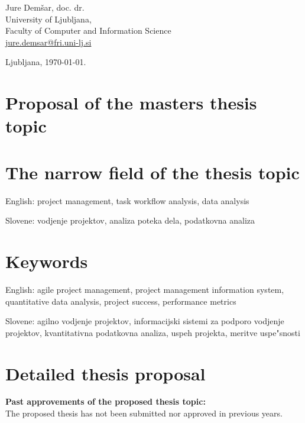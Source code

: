 \documentclass[a4paper, 12pt]{article}
\begin{document}
\hfill\begin{minipage}{\dimexpr\textwidth-2cm}
Jure Demšar, doc. dr. \\
University of Ljubljana, \\
Faculty of Computer and Information Science\\
\href{mailto:jure.demsar@fri.uni-lj.si}{jure.demsar@fri.uni-lj.si}
\end{minipage}

\bigskip

\hfill Ljubljana, \today.


\clearpage
\section*{Proposal of the masters thesis topic}

\section{The narrow field of the thesis topic}

English: project management, task workflow analysis, data analysis

Slovene: vodjenje projektov, analiza poteka dela, podatkovna analiza

\section{Keywords}

English: agile project management, project management information system, quantitative data analysis, project success, performance metrics

Slovene: agilno vodjenje projektov, informacijski sistemi za podporo vodjenje projektov, kvantitativna podatkovna analiza, uspeh projekta, meritve uspe"snosti

\section{Detailed thesis proposal}


\textbf{Past approvements of the proposed thesis topic:}\\
The proposed thesis has not been submitted nor approved in previous years.
\end{document}
